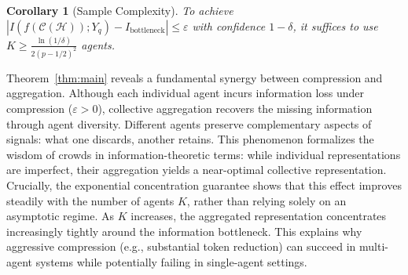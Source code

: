 \documentclass{article}
\theoremstyle{plain}
\newtheorem{corollary}[theorem]{Corollary}
\theoremstyle{definition}
\theoremstyle{remark}
\begin{document}

\begin{corollary}[Sample Complexity]
\label{cor:sample_complexity}
To achieve $|I(f(\mathcal{C}(\mathcal{H})); Y_q) - I_{\text{bottleneck}}| \leq \varepsilon$ with confidence $1-\delta$, it suffices to use $K \geq \frac{\ln(1/\delta)}{2(p-1/2)^2}$ agents.
\end{corollary}

Theorem~\ref{thm:main} reveals a fundamental synergy between compression and aggregation. Although each individual agent incurs information loss under compression ($\varepsilon > 0$), collective aggregation recovers the missing information through agent diversity. Different agents preserve complementary aspects of signals: what one discards, another retains. This phenomenon formalizes the wisdom of crowds in information-theoretic terms: while individual representations are imperfect, their aggregation yields a near-optimal collective representation. Crucially, the exponential concentration guarantee shows that this effect improves steadily with the number of agents $K$, rather than relying solely on an asymptotic regime. As $K$ increases, the aggregated representation concentrates increasingly tightly around the information bottleneck. This explains why aggressive compression (e.g., substantial token reduction) can succeed in multi-agent systems while potentially failing in single-agent settings.
\end{document}
